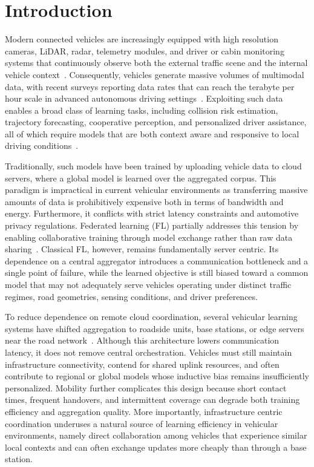\section{Introduction}
\label{sec:introduction}

Modern connected vehicles are increasingly equipped with high resolution cameras, LiDAR, radar, telemetry modules, and driver or cabin monitoring systems that continuously observe both the external traffic scene and the internal vehicle context~\cite{rajashekara2024data,li2020smart}. Consequently, vehicles generate massive volumes of multimodal data, with recent surveys reporting data rates that can reach the terabyte per hour scale in advanced autonomous driving settings~\cite{rajashekara2024data,li2020smart}. Exploiting such data enables a broad class of learning tasks, including collision risk estimation, trajectory forecasting, cooperative perception, and personalized driver assistance, all of which require models that are both context aware and responsive to local driving conditions~\cite{yu2022personalized}.

Traditionally, such models have been trained by uploading vehicle data to cloud servers, where a global model is learned over the aggregated corpus. This paradigm is impractical in current vehicular environments as transferring massive amounts of data is prohibitively expensive both in terms of bandwidth and energy. Furthermore, it conflicts with strict latency constraints and automotive privacy regulations.
Federated learning (FL) partially addresses this tension by enabling collaborative training through model exchange rather than raw data sharing~\cite{mcmahan2017communication,lim2020survey}. Classical FL, however, remains fundamentally server centric. Its dependence on a central aggregator introduces a communication bottleneck and a single point of failure, while the learned objective is still biased toward a common model that may not adequately serve vehicles operating under distinct traffic regimes, road geometries, sensing conditions, and driver preferences.


To reduce dependence on remote cloud coordination, several vehicular learning systems have shifted aggregation to roadside units, base stations, or edge servers near the road network~\cite{wang2023mobilityaware,pervej2023resource,liao2025pfedvs}. Although this architecture lowers communication latency, it does not remove central orchestration. Vehicles must still maintain infrastructure connectivity, contend for shared uplink resources, and often contribute to regional or global models whose inductive bias remains insufficiently personalized. Mobility further complicates this design because short contact times, frequent handovers, and intermittent coverage can degrade both training efficiency and aggregation quality. More importantly, infrastructure centric coordination underuses a natural source of learning efficiency in vehicular environments, namely direct collaboration among vehicles that experience similar local contexts and can often exchange updates more cheaply than through a base station.

